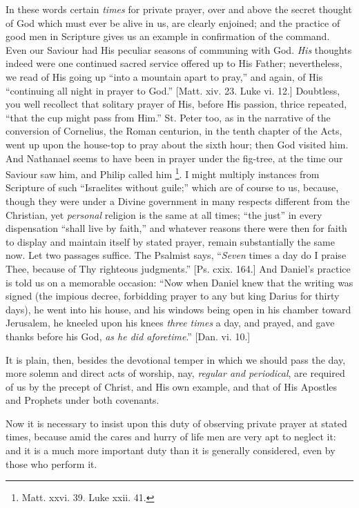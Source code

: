In these words certain \emph{times} for private
prayer, over and above the secret thought of God which
must ever be alive in us, are clearly enjoined; and the
practice of good men in Scripture gives us an example in
confirmation of the command. Even our Saviour had His
peculiar seasons of communing with God. \emph{His}
thoughts indeed were one continued sacred service offered
up to His Father; nevertheless, we read of His going up
``into a mountain apart to pray,'' and again, of
His ``continuing all night in prayer to God.''
[Matt. xiv. 23. Luke vi. 12.] Doubtless, you well
recollect that solitary prayer of His, before His
passion, thrice repeated, ``that the cup might pass
from Him.'' St. Peter too, as in the narrative of the
conversion of Cornelius, the Roman centurion, in the
tenth chapter of the Acts, went up upon the house-top to
pray about the sixth hour; then God visited him. And
Nathanael seems to have been in prayer under the
fig-tree, at the time our Saviour saw him, and Philip
called him \footnote{Matt. xxvi. 39. Luke xxii. 41.}. I might multiply instances from
Scripture of such ``Israelites without guile;''
which are of course to us, because, though they were
under a Divine government in many respects different from
the Christian, yet \emph{personal} religion is the same
at all times; ``the just'' in every dispensation
``shall live by faith,'' and whatever reasons
there were then for faith to display and maintain itself
by stated prayer, remain substantially the same now. Let
two passages suffice. The Psalmist says, ``\emph{Seven}
times a day do I praise Thee, because of Thy righteous
judgments.'' [Ps. cxix. 164.] And Daniel's practice
is told us on a memorable occasion: ``Now when Daniel
knew that the writing was signed (the impious decree,
forbidding prayer to any but king Darius for thirty
days), he went into his house, and his windows being open
in his chamber toward Jerusalem, he kneeled upon his
knees \emph{three times} a day, and prayed, and gave
thanks before his God, \emph{as he did aforetime}.''
[Dan. vi. 10.]

It is plain, then, besides the devotional temper in
which we should pass the day, more solemn and direct acts
of worship, nay, \emph{regular and periodical}, are
required of us by the precept of Christ, and His own
example, and that of His Apostles and Prophets under both
covenants.

Now it is necessary to insist upon this duty of
observing private prayer at stated times, because amid
the cares and hurry of life men are very apt to neglect
it: and it is a much more important duty than it is
generally considered, even by those who perform it.

